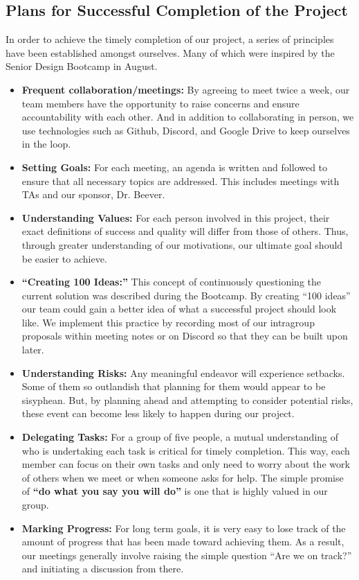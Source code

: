 \subsection{Plans for Successful Completion of the Project}
In order to achieve the timely completion of our project, a series of principles have been established amongst ourselves. Many of which were inspired by the Senior Design Bootcamp in August.
\begin{itemize}
  \item \textbf{Frequent collaboration/meetings:} By agreeing to meet twice a week, our team members have the opportunity to raise concerns and ensure accountability with each other. And in addition to collaborating in person, we use technologies such as Github, Discord, and Google Drive to keep ourselves in the loop.
  \item \textbf{Setting Goals:} For each meeting, an agenda is written and followed to ensure that all necessary topics are addressed. This includes meetings with TAs and our sponsor, Dr. Beever.
  \item \textbf{Understanding Values:} For each person involved in this project, their exact definitions of success and quality will differ from those of others. Thus, through greater understanding of  our motivations, our ultimate goal should be easier to achieve.
  \item \textbf{``Creating 100 Ideas:''} This concept of continuously questioning the current solution was described during the Bootcamp. By creating ``100 ideas'' our team could gain a better idea of what a successful project should look like. We implement this practice by recording most of our intragroup proposals within meeting notes or on Discord so that they can be built upon later.
  \item \textbf{Understanding Risks:} Any meaningful endeavor will experience setbacks. Some of them so outlandish that planning for them would appear to be sisyphean. But, by planning ahead and attempting to consider potential risks, these event can become less likely to happen during our project.
  \item \textbf{Delegating Tasks:} For a group of five people, a mutual understanding of who is undertaking each task is critical for timely completion. This way, each member can focus on their own tasks and only need to worry about the work of others when we meet or when someone asks for help. The simple promise of \textbf{``do what you say you will do''} is one that is highly valued in our group.
  \item \textbf{Marking Progress:} For long term goals, it is very easy to lose track of the amount of progress that has been made toward achieving them. As a result, our meetings generally involve raising the simple question ``Are we on track?'' and initiating a discussion from there.

\end{itemize}

